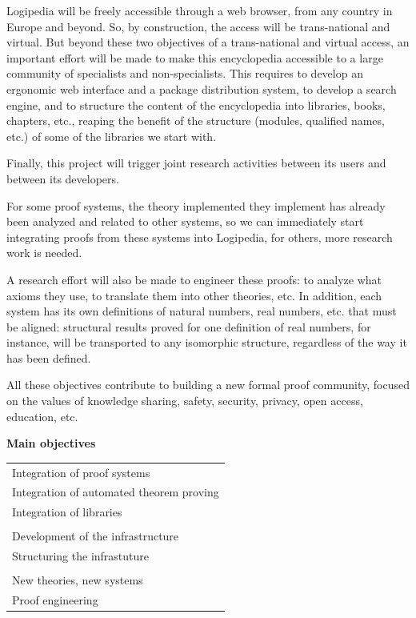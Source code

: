 Logipedia will be freely accessible through a web browser, from any
country in Europe and beyond. So, by construction, the access will be
trans-national and virtual. But beyond these two objectives of a
trans-national and virtual access, an important effort will be made to
make this encyclopedia accessible to a large community of specialists
and non-specialists. This requires to develop an ergonomic web
interface and a package distribution system, to develop a search
engine, and to structure the content of the encyclopedia into
libraries, books, chapters, etc., reaping the benefit of the structure
(modules, qualified names, etc.) of some of the libraries we start
with.

Finally, this project will trigger joint research activities between
its users and between its developers.

For some proof systems, the theory implemented they implement has
already been analyzed and related to other systems, so we can
immediately start integrating proofs from these systems into
Logipedia, for others, more research work is needed.

A research effort will also be made to engineer these proofs: to analyze
what axioms they use, to translate them into other theories, etc.  In
addition, each system has its own definitions of natural numbers, real
numbers, etc. that must be aligned: structural results proved for one
definition of real numbers, for instance, will be transported to any
isomorphic structure, regardless of the way it has been defined.

All these objectives contribute to building a new formal proof
community, focused on the values of
knowledge sharing, safety, security, privacy, open access, education, etc.

\newpage

\begin{framed}
\begin{center}
{\bf Main objectives}
\end{center}

\begin{tabular}{l}
  Integration of proof systems\\
  Integration of automated theorem proving\\
  Integration of libraries\\
  \\
  Development of the infrastructure\\
  Structuring the infrastuture\\
  \\
  New theories, new systems\\
  Proof engineering\\
\end{tabular}
\end{framed}


